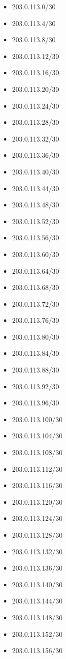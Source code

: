 \documentclass[a4paper,10pt]{article}
\begin{document}
\begin{itemize}
  \item 203.0.113.0/30
  \item 203.0.113.4/30
  \item 203.0.113.8/30
  \item 203.0.113.12/30
  \item 203.0.113.16/30
  \item 203.0.113.20/30
  \item 203.0.113.24/30
  \item 203.0.113.28/30
  \item 203.0.113.32/30
  \item 203.0.113.36/30
  \item 203.0.113.40/30
  \item 203.0.113.44/30
  \item 203.0.113.48/30
  \item 203.0.113.52/30
  \item 203.0.113.56/30
  \item 203.0.113.60/30
  \item 203.0.113.64/30
  \item 203.0.113.68/30
  \item 203.0.113.72/30
  \item 203.0.113.76/30
  \item 203.0.113.80/30
  \item 203.0.113.84/30
  \item 203.0.113.88/30
  \item 203.0.113.92/30
  \item 203.0.113.96/30
  \item 203.0.113.100/30
  \item 203.0.113.104/30
  \item 203.0.113.108/30
  \item 203.0.113.112/30
  \item 203.0.113.116/30
  \item 203.0.113.120/30
  \item 203.0.113.124/30
  \item 203.0.113.128/30
  \item 203.0.113.132/30
  \item 203.0.113.136/30
  \item 203.0.113.140/30
  \item 203.0.113.144/30
  \item 203.0.113.148/30
  \item 203.0.113.152/30
  \item 203.0.113.156/30

\end{itemize}
\end{document}
